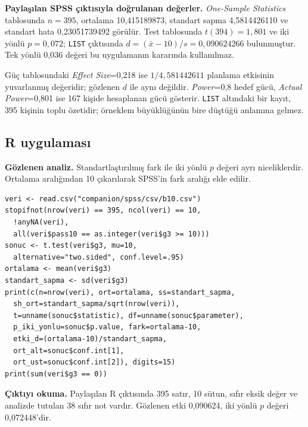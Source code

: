 \begin{outputguidebox}
\textbf{Paylaşılan SPSS çıktısıyla doğrulanan değerler.}
\emph{One-Sample Statistics} tablosunda $n=395$, ortalama
10,415189873, standart sapma 4,5814426110 ve standart hata
0,23051739492 görülür. Test tablosunda $t(394)=1{,}801$ ve
iki yönlü $p=0{,}072$; \texttt{LIST} çıktısında
$d=(\bar x-10)/s=0{,}090624266$ bulunmuştur.
Tek yönlü 0,036 değeri bu uygulamanın kararında kullanılmaz.

Güç tablosundaki \emph{Effect Size}=0,218 ise
$1/4{,}581442611$ planlama etkisinin yuvarlanmış değeridir;
gözlenen $d$ ile aynı değildir. \emph{Power}=0,8 hedef gücü,
\emph{Actual Power}=0,801 ise 167 kişide hesaplanan gücü gösterir.
\texttt{LIST} altındaki bir kayıt, 395 kişinin toplu özetidir;
örneklem büyüklüğünün bire düştüğü anlamına gelmez.
\end{outputguidebox}


\par\noindent\begin{minipage}{\linewidth}
\subsection{R uygulaması}
\label{sec:r-gercek-b10}

\textbf{Gözlenen analiz.} Standartlaştırılmış fark ile iki yönlü
$p$ değeri ayrı niceliklerdir. Ortalama aralığından 10 çıkarılarak
SPSS'in fark aralığı elde edilir.

\begin{lstlisting}[style=prismR]
veri <- read.csv("companion/spss/csv/b10.csv")
stopifnot(nrow(veri) == 395, ncol(veri) == 10,
  !anyNA(veri),
  all(veri$pass10 == as.integer(veri$g3 >= 10)))
sonuc <- t.test(veri$g3, mu=10,
  alternative="two.sided", conf.level=.95)
ortalama <- mean(veri$g3)
standart_sapma <- sd(veri$g3)
print(c(n=nrow(veri), ort=ortalama, ss=standart_sapma,
  sh_ort=standart_sapma/sqrt(nrow(veri)),
  t=unname(sonuc$statistic), df=unname(sonuc$parameter),
  p_iki_yonlu=sonuc$p.value, fark=ortalama-10,
  etki_d=(ortalama-10)/standart_sapma,
  ort_alt=sonuc$conf.int[1],
  ort_ust=sonuc$conf.int[2]), digits=15)
print(sum(veri$g3 == 0))
\end{lstlisting}

\textbf{Çıktıyı okuma.} Paylaşılan R çıktısında 395 satır, 10 sütun,
sıfır eksik değer ve analizde tutulan 38 sıfır not vardır.
Gözlenen etki 0,090624, iki yönlü $p$ değeri 0,072448'dir.
\end{minipage}\par


